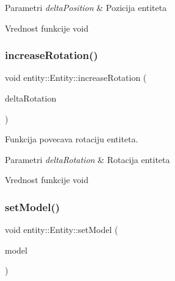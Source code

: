 \begin{DoxyParams}{Parametri}
{\em delta\+Position} & Pozicija entiteta \\
\hline
\end{DoxyParams}
\begin{DoxyReturn}{Vrednost funkcije}
void 
\end{DoxyReturn}
\mbox{\label{classentity_1_1Entity_ac5bd766ea7810db89b8948160916768a}} 
\subsubsection{\texorpdfstring{increase\+Rotation()}{increaseRotation()}}
{\footnotesize\ttfamily void entity\+::\+Entity\+::increase\+Rotation (\begin{DoxyParamCaption}\item[{vec3}]{delta\+Rotation }\end{DoxyParamCaption})}



Funkcija povecava rotaciju entiteta. 


\begin{DoxyParams}{Parametri}
{\em delta\+Rotation} & Rotacija entiteta \\
\hline
\end{DoxyParams}
\begin{DoxyReturn}{Vrednost funkcije}
void 
\end{DoxyReturn}
\mbox{\label{classentity_1_1Entity_a68bdcd0dcae978514e87ee53c60367e2}} 
\subsubsection{\texorpdfstring{set\+Model()}{setModel()}}
{\footnotesize\ttfamily void entity\+::\+Entity\+::set\+Model (\begin{DoxyParamCaption}\item[{\hyperlink{classmodel_1_1TexturedModel}{Textured\+Model} $\ast$}]{model }\end{DoxyParamCaption})}



